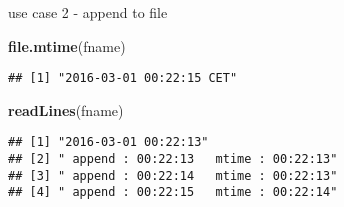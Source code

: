 \documentclass[ignorenonframetext,]{beamer}
\newenvironment{Shaded}{\begin{snugshade}}{\end{snugshade}}
\newcommand{\KeywordTok}[1]{\textcolor[rgb]{0.13,0.29,0.53}{\textbf{{#1}}}}
\newcommand{\NormalTok}[1]{{#1}}
\begin{document}
\begin{frame}[fragile]{use case 2 - append to file}

\begin{Shaded}
\begin{Highlighting}[]
\KeywordTok{file.mtime}\NormalTok{(fname)}
\end{Highlighting}
\end{Shaded}

\begin{verbatim}
## [1] "2016-03-01 00:22:15 CET"
\end{verbatim}

\begin{Shaded}
\begin{Highlighting}[]
\KeywordTok{readLines}\NormalTok{(fname)}
\end{Highlighting}
\end{Shaded}

\begin{verbatim}
## [1] "2016-03-01 00:22:13"                  
## [2] " append : 00:22:13   mtime : 00:22:13"
## [3] " append : 00:22:14   mtime : 00:22:13"
## [4] " append : 00:22:15   mtime : 00:22:14"
\end{verbatim}

\end{frame}
\end{document}
